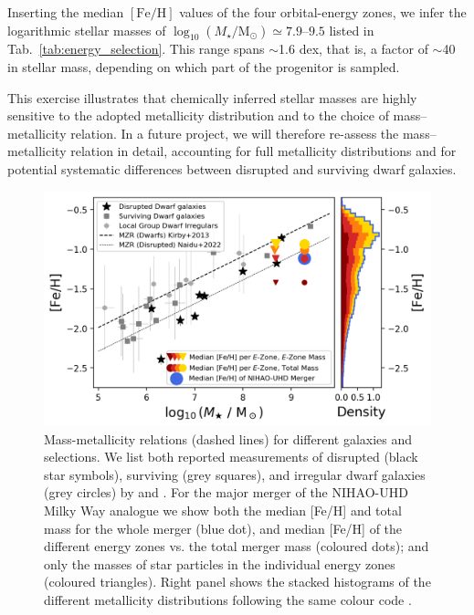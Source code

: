 \documentclass[fleqn,usenatbib]{mnras}
\begin{document}
Inserting the median $\mathrm{[Fe/H]}$ values of the four orbital-energy zones, we infer the logarithmic stellar masses of $\log_{10}(M_\star/\mathrm{M_\odot}) \simeq 7.9$–$9.5$ listed in Tab.~\ref{tab:energy_selection}. This range spans $\sim$1.6 dex, that is, a factor of $\sim$40 in stellar mass, depending on which part of the progenitor is sampled. 

This exercise illustrates that chemically inferred stellar masses are highly sensitive to the adopted metallicity distribution and to the choice of mass–metallicity relation. In a future project, we will therefore re-assess the mass–metallicity relation in detail, accounting for full metallicity distributions and for potential systematic differences between disrupted and surviving dwarf galaxies.

\begin{figure}
    \centering
    \includegraphics[width=\columnwidth]{figures/mzr_different_selections.png}
    \caption{Mass-metallicity relations (dashed lines) for different galaxies and selections. We list both reported measurements of disrupted (black star symbols), surviving  (grey squares), and irregular dwarf galaxies (grey circles) by \citet{Kirby2013} and \citet{Naidu2022b}. For the major merger of the NIHAO-UHD Milky Way analogue we show both the median [Fe/H] and total mass for the whole merger (blue dot), and median [Fe/H] of the different energy zones vs. the total merger mass (coloured dots); and only the masses of star particles in the individual energy zones (coloured triangles). Right panel shows the stacked histograms of the different metallicity distributions following the same colour code \href{https://github.com/svenbuder/gse_nihaouhd/tree/main/figures}{\faGithub}.}
    \label{fig:mzr_different_selections}
\end{figure}
\end{document}
